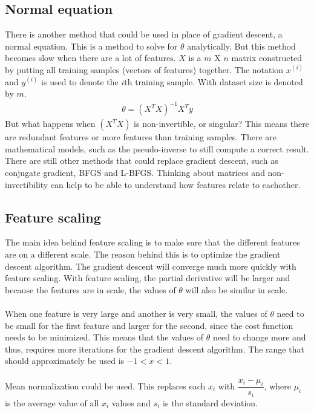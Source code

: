 \subsection{Normal equation}
There is another method that could be used in place of gradient descent, a normal equation. This is a method to solve for $\theta$ analytically. But this method becomes slow when there are a lot of features. $X$ is a $m$ X $n$ matrix constructed by putting all training samples (vectors of features) together. The notation $x^{(i)}$ and $y^{(i)}$ is used to denote the $i$th training sample. With dataset size is denoted by $m$.
 \begin{gather}
  \theta =  (X^TX)^{-1}X^Ty
  \end{gather}
But what happens when $(X^TX)$ is non-invertible, or singular? This means there are redundant features or more features than training samples. There are mathematical models, such as the pseudo-inverse to still compute a correct result. There are still other methods that could replace gradient descent, such as conjugate gradient, BFGS and L-BFGS. Thinking about matrices and non-invertibility can help to be able to understand how features relate to eachother.

\subsection{Feature scaling}
The main idea behind feature scaling is to make sure that the different features are on a different scale. The reason behind this is to optimize the gradient descent algorithm. The gradient descent will converge much more quickly with feature scaling. With feature scaling, the partial derivative will be larger and because the features are in scale, the values of $\theta$ will also be similar in scale.\\
\\
When one feature is very large and another is very small, the values of $\theta$ need to be small for the first feature and larger for the second, since the cost function needs to be minimized. This means that the values of $\theta$ need to change more and thus, requires more iterations for the gradient descent algorithm. The range that should approximately be used is $-1 < x < 1$. \\
\\
Mean normalization could be used. This replaces each $x_i$ with $\dfrac{x_i - \mu_i}{s_i}$, where $\mu_i$ is the average value of all $x_i$ values and $s_i$ is the standard deviation.


